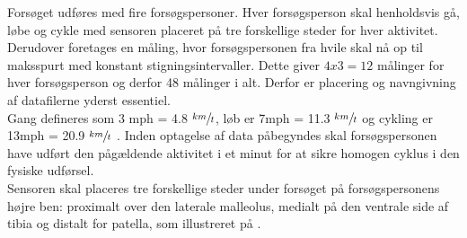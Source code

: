 Forsøget udføres med fire forsøgspersoner. Hver forsøgsperson skal henholdsvis gå, løbe og cykle med sensoren placeret på tre forskellige steder for hver aktivitet. Derudover foretages en måling, hvor forsøgspersonen fra hvile skal nå op til maksspurt med konstant stigningsintervaller. Dette giver $4 x 3 = 12$ målinger for hver forsøgsperson og derfor 48 målinger i alt. Derfor er placering og navngivning af datafilerne yderst essentiel. \\ 
Gang defineres som 3 mph = 4.8 $\sfrac{km}{t}$, løb er 7mph = 11.3 $\sfrac{km}{t}$ og cykling er 13mph = 20.9 $\sfrac{km}{t}$ \citep{Miles2007}. Inden optagelse af data påbegyndes skal forsøgspersonen have udført den pågældende aktivitet i et minut for at sikre homogen cyklus i den fysiske udførsel. \\
Sensoren skal placeres tre forskellige steder under forsøget på forsøgspersonens højre ben: proximalt over den laterale malleolus, medialt på den ventrale side af tibia og distalt for patella, som illustreret på .
